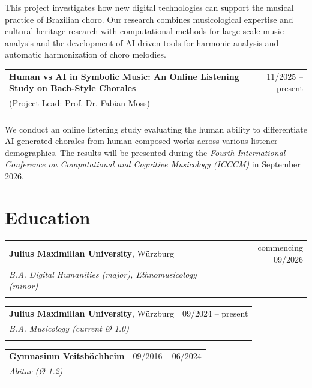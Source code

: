 \documentclass[11pt,a4paper]{article}
\begin{document}
This project investigates how new digital technologies can support the musical practice of Brazilian choro. Our research combines musicological expertise and cultural heritage research with computational methods for large-scale music analysis and the development of AI-driven tools for harmonic analysis and automatic harmonization of choro melodies.

\vspace{0.5cm}
\begin{tabularx}{\textwidth}{X r}
\textbf{Human vs AI in Symbolic Music: An Online Listening Study on Bach-Style Chorales} & 11/2025 -- present \\
(Project Lead: Prof. Dr. Fabian Moss) & \\\\
\end{tabularx}

We conduct an online listening study evaluating the human ability to differentiate AI-generated chorales from human-composed works across various listener demographics. The results will be presented during the \textit{Fourth International Conference on Computational and Cognitive Musicology (ICCCM)} in September 2026.

\section{Education}
\begin{tabularx}{\textwidth}{X r}
\textbf{Julius Maximilian University}, Würzburg & commencing 09/2026 \\
\textit{B.A. Digital Humanities (major), Ethnomusicology (minor)} & \\\\
\end{tabularx}
\begin{tabularx}{\textwidth}{X r}
\textbf{Julius Maximilian University}, Würzburg & 09/2024 -- present \\
\textit{B.A. Musicology (current Ø 1.0)} & \\\\
\end{tabularx}

\begin{tabularx}{\textwidth}{X r}
\textbf{Gymnasium Veitshöchheim} & 09/2016 -- 06/2024 \\
\textit{Abitur (Ø 1.2)} & \\\\
\end{tabularx}
\end{document}
